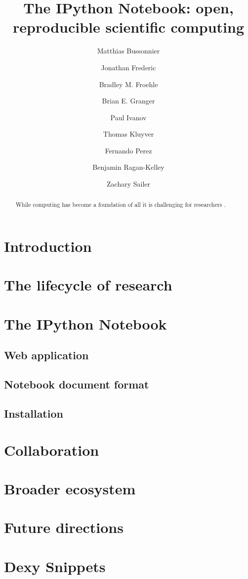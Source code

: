 \documentclass[12pt]{article}
\title{The IPython Notebook: open, reproducible scientific computing}
\author[1]{Matthias Bussonnier}
\author[2]{Jonathan Frederic}
\author[3]{Bradley M. Froehle}
\author[2]{Brian E. Granger}
\author[3]{Paul Ivanov}
\author[3]{Thomas Kluyver}
\author[3]{Fernando Perez}
\author[3]{Benjamin Ragan-Kelley}
\author[2]{Zachary Sailer}
\affil[1]{Affiliation of Matthias}
\affil[2]{Cal Poly State University}
\affil[3]{University of CA, Berkeley}
\begin{document}
\maketitle

\begin{abstract}
While computing has become a foundation of all it is challenging for researchers . 
\end{abstract}

\section{Introduction}

\section{The lifecycle of research}

\section{The IPython Notebook}

\subsection{Web application}

\subsection{Notebook document format}

\subsection{Installation}

\section{Collaboration}

\section{Broader ecosystem}

\section{Future directions}

\section*{Dexy Snippets}
\end{document}
